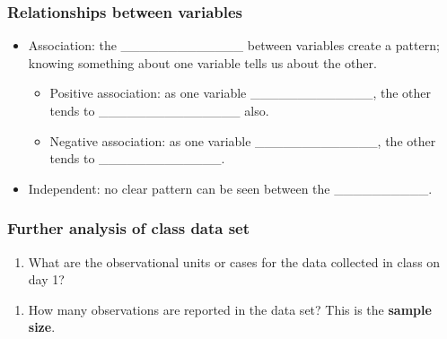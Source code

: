 \documentclass[
]{report}
\providecommand{\tightlist}{%
  \setlength{\itemsep}{0pt}\setlength{\parskip}{0pt}}
\begin{document}
\vspace{0.25in}

\hypertarget{relationships-between-variables}{%
\subsubsection*{Relationships between variables}\label{relationships-between-variables}}


\begin{itemize}
\item
  Association: the \_\_\_\_\_\_\_\_\_\_\_\_\_ between variables create a pattern; knowing something about one variable tells us about the other.

  \begin{itemize}
  \item
    Positive association: as one variable \_\_\_\_\_\_\_\_\_\_\_\_\_, the other tends to \_\_\_\_\_\_\_\_\_\_\_\_\_\_\_ also.
  \item
    Negative association: as one variable \_\_\_\_\_\_\_\_\_\_\_\_\_, the other tends to \_\_\_\_\_\_\_\_\_\_\_\_\_.
  \end{itemize}
\item
  Independent: no clear pattern can be seen between the \_\_\_\_\_\_\_\_\_\_.
\end{itemize}


\hypertarget{further-analysis-of-class-data-set}{%
\subsubsection*{Further analysis of class data set}\label{further-analysis-of-class-data-set}}

\begin{enumerate}
\def\labelenumi{\arabic{enumi}.}
\tightlist
\item
  What are the observational units or cases for the data collected in class on day 1?
\end{enumerate}

\vspace{0.3in}

\begin{enumerate}
\def\labelenumi{\arabic{enumi}.}
\setcounter{enumi}{1}
\tightlist
\item
  How many observations are reported in the data set? This is the \textbf{sample size}.
\end{enumerate}
\end{document}
